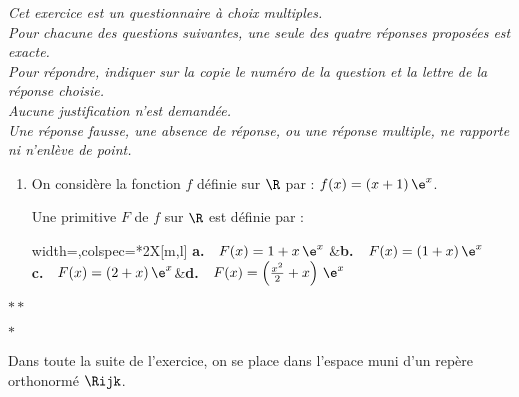 \emph{Cet exercice est un questionnaire à choix multiples.\\ Pour chacune des questions suivantes, une seule des quatre réponses proposées est exacte.\\ Pour répondre, indiquer sur la copie le numéro de la question et la lettre de la réponse choisie.\\ Aucune justification n'est demandée.\\ Une réponse fausse, une absence de réponse, ou une réponse multiple, ne rapporte ni n'enlève de point.}

\smallskip

\begin{enumerate}
	\item On considère la fonction $f$ définie sur $\R$ par : $f(x) = (x+1)\,\e^x$.
	
	Une primitive $F$ de $f$ sur $\R$ est définie par :
	
	\medskip
	
	\begin{tblr}{width=\linewidth,colspec={*{2}{X[m,l]}}}
		\textbf{a.}~~$F(x)=1+x\,\e^{x}$ &\textbf{b.}~~$F(x)=(1+x)\,\e^{x}$ \\
		\textbf{c.}~~$F(x)=(2+x)\,\e^{x}$&\textbf{d.}~~$F(x)=\left(\frac{x^2}{2}+x\right)\,\e^x$
	\end{tblr}
\end{enumerate}

\begin{center}
	$\ast\ast$
	
	\vspace*{-0.5\baselineskip}
	
	$\ast$
\end{center}

Dans toute la suite de l'exercice, on se place dans l'espace muni d'un repère orthonormé $\Rijk$.


